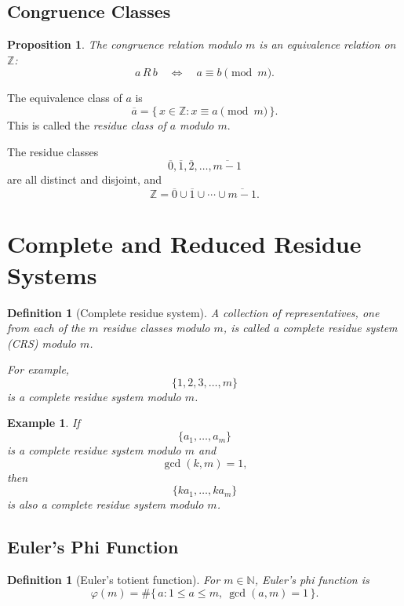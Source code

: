 \documentclass[11pt]{article}
\newtheorem{proposition}[theorem]{Proposition}
\newtheorem{definition}[theorem]{Definition}
\newtheorem{example}[theorem]{Example}
\theoremstyle{remark}
\DeclareMathOperator{\gcdop}{gcd}
\newcommand{\Z}{\mathbb Z}
\newcommand{\N}{\mathbb N}
\newcommand{\phiE}{\varphi}
\begin{document}
\subsection{Congruence Classes}

\begin{proposition}
The congruence relation modulo $m$ is an equivalence relation on $\Z$:
\[
    a\,R\,b
    \quad\Longleftrightarrow\quad
    a\equiv b\pmod m.
\]
\end{proposition}

The equivalence class of $a$ is
\[
    \overline{a}
    =
    \{\,x\in\Z:x\equiv a\pmod m\,\}.
\]
This is called the \emph{residue class of $a$ modulo $m$}.

The residue classes
\[
    \overline{0},\overline{1},\overline{2},\ldots,\overline{m-1}
\]
are all distinct and disjoint, and
\[
    \Z
    =
    \overline{0}\cup\overline{1}\cup\cdots\cup\overline{m-1}.
\]

\section{Complete and Reduced Residue Systems}

\begin{definition}[Complete residue system]
A collection of representatives, one from each of the $m$ residue classes
modulo $m$, is called a \emph{complete residue system} (CRS) modulo $m$.

For example,
\[
    \{1,2,3,\ldots,m\}
\]
is a complete residue system modulo $m$.
\end{definition}

\begin{example}
If
\[
    \{a_1,\ldots,a_m\}
\]
is a complete residue system modulo $m$ and
\[
    \gcdop(k,m)=1,
\]
then
\[
    \{ka_1,\ldots,ka_m\}
\]
is also a complete residue system modulo $m$.
\end{example}

\subsection{Euler's Phi Function}

\begin{definition}[Euler's totient function]
For $m\in\N$, Euler's phi function is
\[
    \phiE(m)
    =
    \#\{\,a:1\le a\le m,\ \gcdop(a,m)=1\,\}.
\]
\end{definition}
\end{document}
